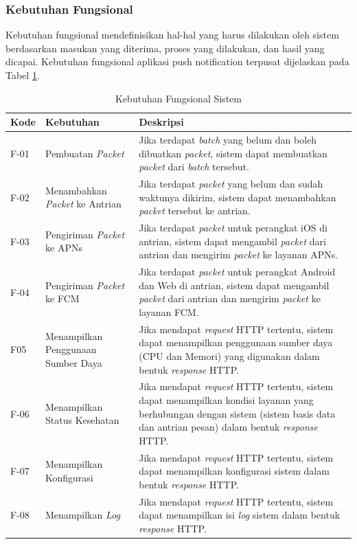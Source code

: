 \subsubsection{Kebutuhan Fungsional}
\par Kebutuhan fungsional mendefinisikan hal-hal yang harus dilakukan oleh sistem berdasarkan masukan yang diterima, proses yang dilakukan, dan hasil yang dicapai. Kebutuhan fungsional aplikasi push notification terpusat dijelaskan pada Tabel \ref{t:fungsional}.
\begin{longtable}{|p{1cm}|p{3cm}|p{5cm}|}
    \caption{Kebutuhan Fungsional Sistem} \label{t:fungsional} \\ \hline
    \rowcolor{lightgray} Kode & {Kebutuhan} & Deskripsi \\ \hline
    \endhead
    F-01 & Pembuatan \textit{Packet} & Jika terdapat \textit{batch} yang belum dan boleh dibuatkan \textit{packet}, sistem dapat membuatkan \textit{packet} dari \textit{batch} tersebut. \\ \hline
    F-02 & Menambahkan \textit{Packet} ke Antrian & Jika terdapat \textit{packet} yang belum dan sudah waktunya dikirim, sistem dapat menambahkan \textit{packet} tersebut ke antrian. \\ \hline
    F-03 & Pengiriman \textit{Packet} ke APNs & Jika terdapat \textit{packet} untuk perangkat iOS di antrian, sistem dapat mengambil \textit{packet} dari antrian dan mengirim \textit{packet} ke layanan APNs. \\ \hline
    F-04 & Pengiriman \textit{Packet} ke FCM & Jika terdapat \textit{packet} untuk perangkat Android dan Web di antrian, sistem dapat mengambil \textit{packet} dari antrian dan mengirim \textit{packet} ke layanan FCM. \\ \hline
    F05 & Menampilkan Penggunaan Sumber Daya & Jika mendapat \textit{request} HTTP tertentu, sistem dapat menampilkan penggunaan sumber daya (CPU dan Memori) yang digunakan dalam bentuk \textit{response} HTTP. \\ \hline
    F-06 & Menampilkan Status Kesehatan & Jika mendapat \textit{request} HTTP tertentu, sistem dapat menampilkan kondisi layanan yang berhubungan dengan sistem (sistem basis data dan antrian pesan) dalam bentuk \textit{response} HTTP. \\ \hline
    F-07 & Menampilkan Konfigurasi & Jika mendapat \textit{request} HTTP tertentu, sistem dapat menampilkan konfigurasi sistem dalam bentuk \textit{response} HTTP. \\ \hline
    F-08 & Menampilkan \textit{Log} & Jika mendapat \textit{request} HTTP tertentu, sistem dapat menampilkan isi \textit{log} sistem dalam bentuk \textit{response} HTTP. \\ \hline
\end{longtable}

